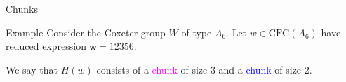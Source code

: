 \documentclass[9pt,handout]{beamer}
\newcommand{\w}{{\textsf{w}}}
\newcommand{\CFC}{\mathrm{CFC}}
\newcommand\xxaxis{0}
\newcommand\yyaxis{90}
\newcommand\sqbl[2]{
    \fill[draw=darkblue, fill=darkblue!05, line width=1.1pt, rounded corners, shift={(\xxaxis:#1)}, shift={(\yyaxis:#2)}]
    (0,0) -- (1,0) -- (1,-1) -- (0,-1) -- cycle; }
\newcommand\sqm[2]{
    \fill[draw=magenta, fill=magenta!08, line width=1.1pt, rounded corners, shift={(\xxaxis:#1)}, shift={(\yyaxis:#2)}]
    (0,0) -- (1,0) -- (1,-1) -- (0,-1) -- cycle; }
\begin{document}
\begin{frame}{Chunks}
\begin{block}{Example} Consider the Coxeter group $W$ of type $A_6$. Let $w \in \CFC(A_6)$ have reduced expression $\w = 12356$.
\begin{center} %
\end{center}
    \pause
    We say that $H(w)$ consists of a \textcolor{magenta}{chunk} of size 3 and a \textcolor{blue}{chunk} of size 2.
\end{block}
\end{frame}
\end{document}
